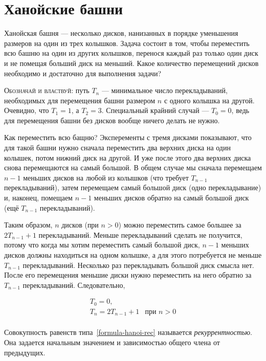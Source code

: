 \section{Ханойские башни}

Ханойская башня --- несколько дисков, нанизанных в порядке уменьшения размеров на один из
трех колышков. Задача состоит в том, чтобы переместить всю башню на один из других колышков,
перенося каждый раз только один диск и не помещая больший диск на меньший.
Какое количество перемещений дисков необходимо и достаточно для выполнения задачи?

\textsc{Обозначай и властвуй}: путь $T_n$ --- минимальное число перекладываний, необходимых
для перемещения башни размером $n$ с одного колышка на другой. Очевидно, что $T_1=1$, а $T_2=3$.
Специальный крайний случай --- $T_0=0$, ведь для перемещения башни без дисков вообще ничего делать
не нужно.

Как переместить всю бащню? Эксперементы с тремя дисками показывают, что для такой башни нужно 
сначала переместить два верхних диска на один колышек, потом нижний диск на другой. И уже 
после этого два верхних диска снова перемещаются на самый большой. В общем случае мы сначала
перемещаем $n-1$ меньших дисков на любой из колышков (что требует $T_{n-1}$ перекладываний),
затем перемещаем самый большой диск (одно перекладывание) и, наконец, помещаем $n-1$
меньших дисков обратно на самый большой диск (ещё $T_{n-1}$ перекладываний). 

Таким образом, $n$ дисков (при $n>0$) можно переместить самое большее за $2T_{n-1}+1$
перекладываний. Меньше перекладываний сделать не получится, потому что когда мы хотим
переместить самый большой диск, $n-1$ меньших дисков должны находиться на одном колышке,
а для этого потребуется не меньше $T_{n-1}$ перекладываний.
Несколько раз перекладывать большой диск смысла нет. После его перемещения меньшие диски нужно
переместить на него обратно за $T_{n-1}$ перекладываний. Следовательно,

\begin{equation}
\label{formula-hanoi-rec}
\begin{array}{ll}
T_0 = 0, \\
T_n = 2T_{n-1} + 1 & \text{при } n > 0 \\
\end{array}
\end{equation}

Совокупность равенств типа~\ref{formula-hanoi-rec} называется \emph{рекуррентностью}. Она задается
начальным значением и зависимостью общего члена от предыдущих.

